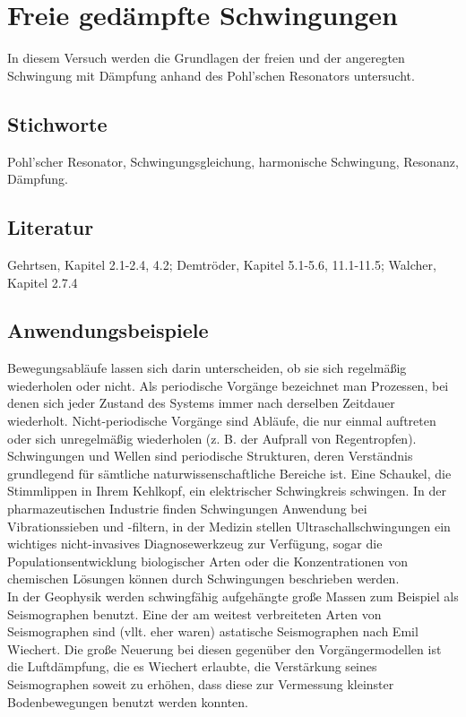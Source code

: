 \chapter{Freie gedämpfte Schwingungen}
\label{vn:1}

In diesem Versuch werden die Grundlagen der freien und der angeregten Schwingung mit Dämpfung anhand des Pohl'schen Resonators untersucht.


\section{Stichworte}
Pohl'scher Resonator, Schwingungsgleichung, harmonische Schwingung, Resonanz, Dämpfung.
%
\section{Literatur}
Gehrtsen, Kapitel 2.1-2.4, 4.2; Demtröder, Kapitel 5.1-5.6, 11.1-11.5; Walcher, Kapitel 2.7.4
%
\section{Anwendungsbeispiele}
%
Bewegungsabläufe lassen sich darin unterscheiden, ob sie sich regelmäßig wiederholen oder nicht. Als periodische Vorgänge bezeichnet man Prozessen, bei denen sich jeder Zustand des Systems immer nach derselben Zeitdauer wiederholt. Nicht-periodische Vorgänge sind Abläufe, die nur einmal auftreten oder sich unregelmäßig wiederholen (z. B. der Aufprall von Regentropfen).\\
Schwingungen und Wellen sind periodische Strukturen, deren Verständnis grundlegend für sämtliche naturwissenschaftliche Bereiche ist. Eine Schaukel, die Stimmlippen in Ihrem Kehlkopf, ein elektrischer Schwingkreis schwingen. In der pharmazeutischen Industrie finden Schwingungen Anwendung bei Vibrationssieben und -filtern, in der Medizin stellen Ultraschallschwingungen ein wichtiges nicht-invasives Diagnosewerkzeug zur Verfügung, sogar die Populationsentwicklung biologischer Arten oder die Konzentrationen von chemischen Lösungen können durch Schwingungen beschrieben werden.\\
In der Geophysik werden schwingfähig aufgehängte große Massen zum Beispiel als Seismographen benutzt. Eine der am weitest verbreiteten Arten von Seismographen sind (vllt. eher waren) astatische Seismographen nach Emil Wiechert. Die große Neuerung bei diesen gegenüber den Vorgängermodellen ist die Luftdämpfung, die es Wiechert erlaubte, die Verstärkung seines Seismographen soweit zu erhöhen, dass diese zur Vermessung kleinster Bodenbewegungen benutzt werden konnten.\\


